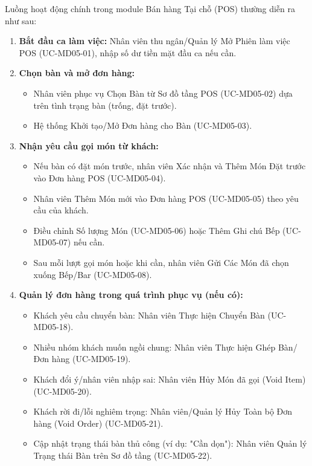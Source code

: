 \label{sssec:md05_overall_workflow}
Luồng hoạt động chính trong module Bán hàng Tại chỗ (POS) thường diễn ra như sau:
\begin{enumerate}
    \item \textbf{Bắt đầu ca làm việc:} Nhân viên thu ngân/Quản lý Mở Phiên làm việc POS (UC-MD05-01), nhập số dư tiền mặt đầu ca nếu cần.
    \item \textbf{Chọn bàn và mở đơn hàng:}
        \begin{itemize}
            \item Nhân viên phục vụ Chọn Bàn từ Sơ đồ tầng POS (UC-MD05-02) dựa trên tình trạng bàn (trống, đặt trước).
            \item Hệ thống Khởi tạo/Mở Đơn hàng cho Bàn (UC-MD05-03).
        \end{itemize}
    \item \textbf{Nhận yêu cầu gọi món từ khách:}
        \begin{itemize}
            \item Nếu bàn có đặt món trước, nhân viên Xác nhận và Thêm Món Đặt trước vào Đơn hàng POS (UC-MD05-04).
            \item Nhân viên Thêm Món mới vào Đơn hàng POS (UC-MD05-05) theo yêu cầu của khách.
            \item Điều chỉnh Số lượng Món (UC-MD05-06) hoặc Thêm Ghi chú Bếp (UC-MD05-07) nếu cần.
            \item Sau mỗi lượt gọi món hoặc khi cần, nhân viên Gửi Các Món đã chọn xuống Bếp/Bar (UC-MD05-08).
        \end{itemize}
    \item \textbf{Quản lý đơn hàng trong quá trình phục vụ (nếu có):}
        \begin{itemize}
            \item Khách yêu cầu chuyển bàn: Nhân viên Thực hiện Chuyển Bàn (UC-MD05-18).
            \item Nhiều nhóm khách muốn ngồi chung: Nhân viên Thực hiện Ghép Bàn/Đơn hàng (UC-MD05-19).
            \item Khách đổi ý/nhân viên nhập sai: Nhân viên Hủy Món đã gọi (Void Item) (UC-MD05-20).
            \item Khách rời đi/lỗi nghiêm trọng: Nhân viên/Quản lý Hủy Toàn bộ Đơn hàng (Void Order) (UC-MD05-21).
            \item Cập nhật trạng thái bàn thủ công (ví dụ: "Cần dọn"): Nhân viên Quản lý Trạng thái Bàn trên Sơ đồ tầng (UC-MD05-22).

\end{itemize}
\end{enumerate}
